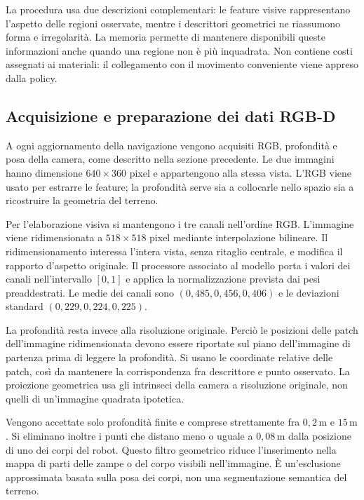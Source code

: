 La procedura usa due descrizioni complementari: le feature visive rappresentano l'aspetto delle regioni osservate, mentre i descrittori geometrici ne riassumono forma e irregolarità. La memoria permette di mantenere disponibili queste informazioni anche quando una regione non è più inquadrata. Non contiene costi assegnati ai materiali: il collegamento con il movimento conveniente viene appreso dalla policy.

\subsection{Acquisizione e preparazione dei dati RGB-D}

A ogni aggiornamento della navigazione vengono acquisiti RGB, profondità e posa della camera, come descritto nella sezione precedente. Le due immagini hanno dimensione $640\times360$ pixel e appartengono alla stessa vista. L'RGB viene usato per estrarre le feature; la profondità serve sia a collocarle nello spazio sia a ricostruire la geometria del terreno.

Per l'elaborazione visiva si mantengono i tre canali nell'ordine RGB. L'immagine viene ridimensionata a $518\times518$ pixel mediante interpolazione bilineare. Il ridimensionamento interessa l'intera vista, senza ritaglio centrale, e modifica il rapporto d'aspetto originale. Il processore associato al modello porta i valori dei canali nell'intervallo $[0,1]$ e applica la normalizzazione prevista dai pesi preaddestrati. Le medie dei canali sono $(0{,}485,0{,}456,0{,}406)$ e le deviazioni standard $(0{,}229,0{,}224,0{,}225)$.

La profondità resta invece alla risoluzione originale. Perciò le posizioni delle patch dell'immagine ridimensionata devono essere riportate sul piano dell'immagine di partenza prima di leggere la profondità. Si usano le coordinate relative delle patch, così da mantenere la corrispondenza fra descrittore e punto osservato. La proiezione geometrica usa gli intrinseci della camera a risoluzione originale, non quelli di un'immagine quadrata ipotetica.

Vengono accettate solo profondità finite e comprese strettamente fra $0{,}2\,\mathrm{m}$ e $15\,\mathrm{m}$. Si eliminano inoltre i punti che distano meno o uguale a $0{,}08\,\mathrm{m}$ dalla posizione di uno dei corpi del robot. Questo filtro geometrico riduce l'inserimento nella mappa di parti delle zampe o del corpo visibili nell'immagine. È un'esclusione approssimata basata sulla posa dei corpi, non una segmentazione semantica del terreno.

